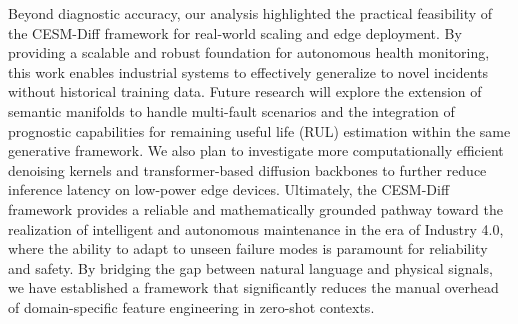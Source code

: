 Beyond diagnostic accuracy, our analysis highlighted the practical feasibility of the CESM-Diff framework for real-world scaling and edge deployment. By providing a scalable and robust foundation for autonomous health monitoring, this work enables industrial systems to effectively generalize to novel incidents without historical training data. Future research will explore the extension of semantic manifolds to handle multi-fault scenarios and the integration of prognostic capabilities for remaining useful life (RUL) estimation within the same generative framework. We also plan to investigate more computationally efficient denoising kernels and transformer-based diffusion backbones to further reduce inference latency on low-power edge devices. Ultimately, the CESM-Diff framework provides a reliable and mathematically grounded pathway toward the realization of intelligent and autonomous maintenance in the era of Industry 4.0, where the ability to adapt to unseen failure modes is paramount for reliability and safety. By bridging the gap between natural language and physical signals, we have established a framework that significantly reduces the manual overhead of domain-specific feature engineering in zero-shot contexts.

